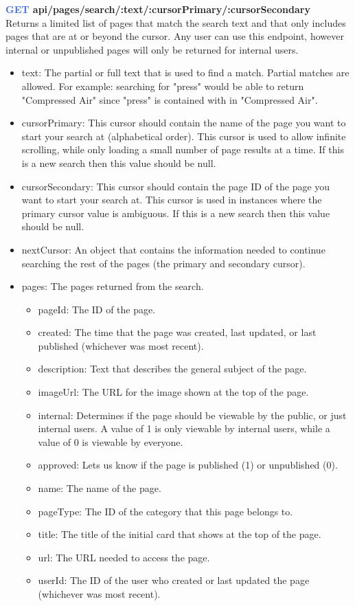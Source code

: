 \documentclass[onecolumn, draftclsnofoot,10pt, compsoc, usenames, dvipsnames]{IEEEtran}
\begin{document}
\noindent
\textbf{\textcolor{RoyalBlue}{GET} api/pages/search/:text/:cursorPrimary/:cursorSecondary} \\
Returns a limited list of pages that match the search text and that only includes pages that are at or beyond the cursor. Any user can use this endpoint, however internal or unpublished pages will only be returned for internal users.
\begin{itemize}
    \begin{itemize}
        \item text: The partial or full text that is used to find a match. Partial matches are allowed. For example: searching for "press" would be able to return "Compressed Air" since "press" is contained with in "Compressed Air".
        \item cursorPrimary: This cursor should contain the name of the page you want to start your search at (alphabetical order). This cursor is used to allow infinite scrolling, while only loading a small number of page results at a time. If this is a new search then this value should be null.
        \item cursorSecondary: This cursor should contain the page ID of the page you want to start your search at. This cursor is used in instances where the primary cursor value is ambiguous. If this is a new search then this value should be null.
        \item nextCursor: An object that contains the information needed to continue searching the rest of the pages (the primary and secondary cursor).
        \item pages: The pages returned from the search.
        \begin{itemize}
            \item pageId: The ID of the page.
            \item created: The time that the page was created, last updated, or last published (whichever was most recent).
            \item description: Text that describes the general subject of the page.
            \item imageUrl: The URL for the image shown at the top of the page.
            \item internal: Determines if the page should be viewable by the public, or just internal users. A value of 1 is only viewable by internal users, while a value of 0 is viewable by everyone.
            \item approved: Lets us know if the page is published (1) or unpublished (0).
            \item name: The name of the page.
            \item pageType: The ID of the category that this page belongs to.
            \item title: The title of the initial card that shows at the top of the page.
            \item url: The URL needed to access the page.
            \item userId: The ID of the user who created or last updated the page (whichever was most recent).
        \end{itemize}
    \end{itemize}
\end{itemize}
\end{document}
